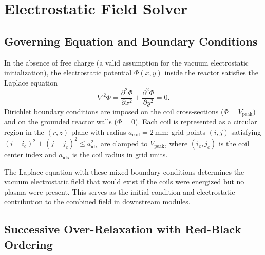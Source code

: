 \documentclass[11pt,a4paper]{report}
\begin{document}
\section{Electrostatic Field Solver}
\label{sec:m02}

\subsection{Governing Equation and Boundary Conditions}

In the absence of free charge (a valid assumption for the vacuum electrostatic initialization), the electrostatic potential $\Phi(x,y)$ inside the reactor satisfies the Laplace equation
\begin{equation}
  \nabla^2 \Phi = \frac{\partial^2 \Phi}{\partial x^2}
                + \frac{\partial^2 \Phi}{\partial y^2} = 0.
  \label{eq:m02-laplace}
\end{equation}
Dirichlet boundary conditions are imposed on the coil cross-sections ($\Phi = V_\mathrm{peak}$) and on the grounded reactor walls ($\Phi = 0$).  Each coil is represented as a circular region in the $(r,z)$ plane with radius $a_\mathrm{coil} = \SI{2}{\milli\meter}$; grid points $(i,j)$ satisfying $(i - i_c)^2 + (j - j_c)^2 \le a_\mathrm{idx}^2$ are clamped to $V_\mathrm{peak}$, where $(i_c, j_c)$ is the coil center index and $a_\mathrm{idx}$ is the coil radius in grid units.

The Laplace equation with these mixed boundary conditions determines the vacuum electrostatic field that would exist if the coils were energized but no plasma were present.  This serves as the initial condition and electrostatic contribution to the combined field in downstream modules.

\subsection{Successive Over-Relaxation with Red-Black Ordering}
\end{document}
